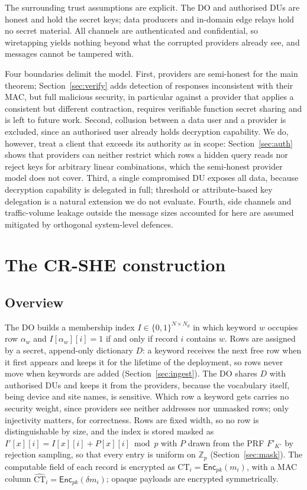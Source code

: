 \documentclass[a4paper,fleqn]{cas-dc}
\newcommand{\Enc}{\mathsf{Enc}}
\begin{document}
The surrounding trust assumptions are explicit. The DO and authorised DUs are
honest and hold the secret keys; data producers and in-domain edge relays hold
no secret material. All channels are authenticated and confidential, so
wiretapping yields nothing beyond what the corrupted providers already see,
and messages cannot be tampered with.

Four boundaries delimit the model. First, providers are semi-honest for the
main theorem; Section~\ref{sec:verify} adds detection of responses
inconsistent with their MAC, but full malicious security, in particular
against a provider that applies a consistent but different contraction,
requires verifiable function secret sharing and is left to future work.
Second, collusion between a data user and a provider is excluded, since an
authorised user already holds decryption capability. We do, however, treat a
client that exceeds its authority as in scope: Section~\ref{sec:auth} shows
that providers can neither restrict which rows a hidden query reads nor reject
keys for arbitrary linear combinations, which the semi-honest provider model
does not cover. Third, a single compromised DU exposes all data, because
decryption capability is delegated in full; threshold or attribute-based key
delegation is a natural extension we do not evaluate. Fourth, side channels
and traffic-volume leakage outside the message sizes accounted for here are
assumed mitigated by orthogonal system-level defences.

\section{The CR-SHE construction}
\label{sec:construction}

\subsection{Overview}
The DO builds a membership index $I\in\{0,1\}^{N\times N_d}$ in which keyword
$w$ occupies row $\alpha_w$ and $I[\alpha_w][i]=1$ if and only if record $i$
contains $w$. Rows are assigned by a secret, append-only dictionary $D$: a
keyword receives the next free row when it first appears and keeps it for the
lifetime of the deployment, so rows never move when keywords are added
(Section~\ref{sec:ingest}). The DO shares $D$ with authorised DUs and keeps it
from the providers, because the vocabulary itself, being device and site
names, is sensitive. Which row a keyword gets carries no security weight,
since providers see neither addresses nor unmasked rows; only injectivity
matters, for correctness. Rows are fixed width, so no row is distinguishable
by size, and the index is stored masked as $I'[x][i]=I[x][i]+P[x][i]\bmod p$
with $P$ drawn from the PRF $F'_{K'}$ by rejection sampling, so that every
entry is uniform on $\mathbb{Z}_p$ (Section~\ref{sec:mask}).
The computable field of each record is encrypted as
$\text{CT}_i=\Enc_{pk}(m_i)$, with a MAC column
$\widehat{\text{CT}}_i=\Enc_{pk}(\delta m_i)$; opaque payloads are encrypted
symmetrically.
\end{document}
